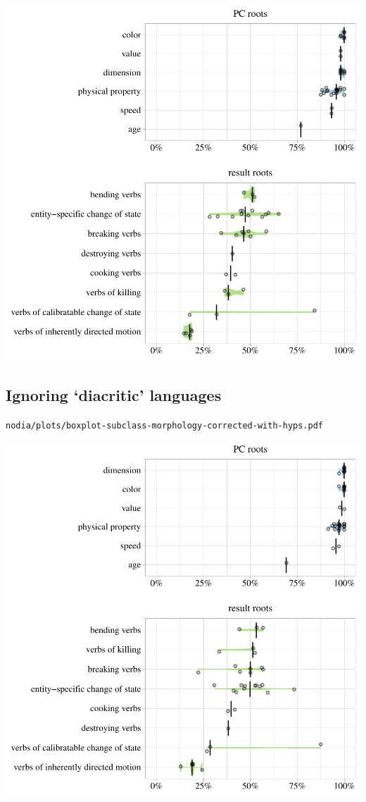 \includegraphics[width=1.0\textwidth]{../nolow/plots/boxplot-subclass-morphology-corrected-with-hyps.pdf}

\subsection{Ignoring `diacritic' languages}

\texttt{nodia/plots/boxplot-subclass-morphology-corrected-with-hyps.pdf}

\includegraphics[width=1.0\textwidth]{../nodia/plots/boxplot-subclass-morphology-corrected-with-hyps.pdf}

